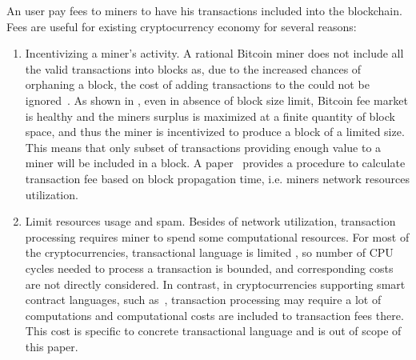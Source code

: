 \documentclass[]{article}   %
\begin{document}


An user pay fees to miners to have his transactions included into the blockchain. Fees are useful for existing cryptocurrency economy for several reasons:

\begin{enumerate}
  \item{Incentivizing a miner's activity. } A rational Bitcoin miner does not include all the valid transactions into blocks as, due to the increased chances of orphaning a block, the cost of adding transactions to the could not be ignored~\cite{rizun2015transaction, andresen2013}. As shown in \cite{rizun2015transaction}, even in absence of block size limit, Bitcoin fee market is healthy and the miners surplus is maximized at a finite quantity of block space, and thus the miner is incentivized to produce a block of a limited size. This means that only subset of transactions providing enough value to a miner will be included in a block. A paper~\cite{rizun2015transaction} provides a procedure to calculate transaction fee based on block propagation time, i.e. miners network resources utilization. 


  \item{Limit resources usage and spam. } Besides of network utilization, transaction processing requires miner to spend some computational resources. For most of the cryptocurrencies, transactional language is limited \cite{script}, so number of CPU cycles needed to process a transaction is bounded, and corresponding costs are not directly considered. In contrast, in cryptocurrencies supporting  smart contract languages, such as~\cite{seijas2016scripting, tezosScript, solidity}, transaction processing may require a lot of computations and computational costs are included to transaction fees there. This cost is specific to concrete transactional language and is out of scope of this paper.
\end{enumerate}
\end{document}
